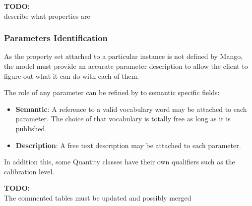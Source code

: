 \documentclass[11pt,a4paper]{ivoa}
\newcommand{\TODO}[1]{%
    \noindent%
    \colorbox{todocolor}{%
            \parbox{0.85\linewidth}{\sffamily \textbf{TODO:}\\
            #1}
    }%
    \vspace{2pt}

}
\begin{document}
\TODO{describe what properties are}

\subsubsection{Parameters Identification}
As the property set  attached to a particular instance is not defined by Mango,
the model must provide an accurate parameter description to allow the client to figure
out what it can do with each of them.

The role of any parameter can be refined by to semantic specific fields: 
\begin{itemize}
    \item \textbf{Semantic}: A reference to  a valid vocabulary word may be attached to each parameter. 
          The choice of that vocabulary is totally free as long as it is published.
    \item \textbf{Description}: A free text description may be attached to each parameter.
\end{itemize}

In addition this, some Quantity classes have their own qualifiers such as the calibration level.

\TODO{The commented tables must be updated and possibly merged}
\end{document}
